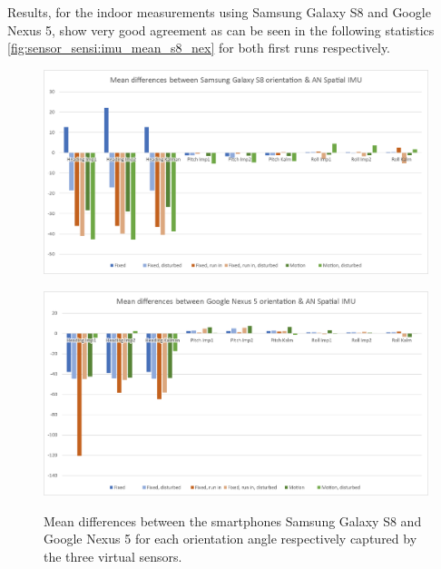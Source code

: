\documentclass[review]{elsarticle}
\begin{document}
Results, for the indoor measurements using Samsung Galaxy S8 and Google Nexus 5, show very good agreement as can be seen in the following statistics \ref{fig:sensor_sensi:imu_mean_s8_nex} for both first runs respectively.

\begin{figure}[htbp!]
\begin{center}
	 	\begin{minipage}{\columnwidth}
	 		\centering
			\subfigure
			{\includegraphics[keepaspectratio, width=1\columnwidth]{graphics/sensor_mean_imu_s8}\label{fig:sensor_sensi:imu_mean_s8_nex5:s8}}
	 	\end{minipage} 
	 	\begin{minipage}{\columnwidth}
	 		\centering
			\subfigure 
			{\includegraphics[keepaspectratio, width=1\columnwidth]{graphics/sensor_mean_imu_nexus5}\label{fig:sensor_sensi:imu_mean_s8_nex5:nex5}}
	 	\end{minipage}
		
		\caption{Mean differences between the smartphones Samsung Galaxy S8 and Google Nexus 5 for each orientation angle respectively captured by the three virtual sensors. }
	\label{fig:sensor_sensi:imu_mean_s8_nex5}
\end{center}
\end{figure}
\end{document}
